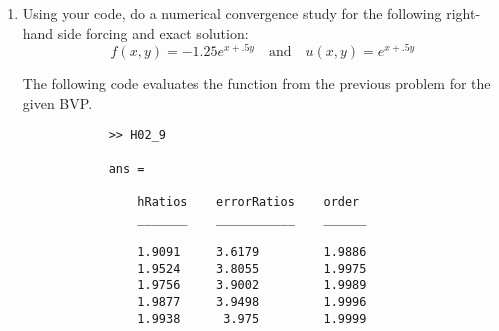 \documentclass[11pt, oneside]{article}
\begin{document}
\begin{enumerate}
    \item %
        Using your code, do a numerical convergence study for the following
        right-hand side forcing and exact solution:
        \[
            f(x,y) = -1.25e^{x + .5y}\quad\text{and}\quad u(x,y) = e^{x + .5y}
        \]

        The following code evaluates the function from the previous problem
        for the given BVP.
        
        \begin{verbatim}
            >> H02_9

            ans = 

                hRatios    errorRatios    order 
                _______    ___________    ______

                1.9091     3.6179         1.9886
                1.9524     3.8055         1.9975
                1.9756     3.9002         1.9989
                1.9877     3.9498         1.9996
                1.9938      3.975         1.9999
        \end{verbatim}
\end{enumerate}
\end{document}
